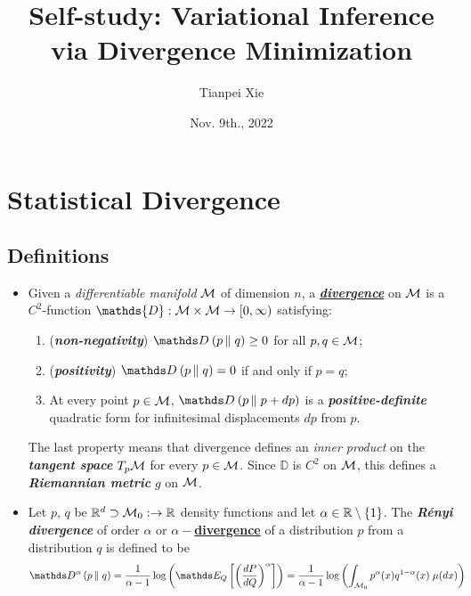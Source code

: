 \documentclass[11pt]{article}
\begin{document}
\title{Self-study: Variational Inference via  Divergence Minimization}
\author{Tianpei Xie}
\date{ Nov. 9th., 2022 }
\maketitle
\tableofcontents
\newpage
\section{Statistical Divergence}
\subsection{Definitions}
\begin{itemize}
\item \begin{definition}
Given a \emph{differentiable manifold} ${\mathcal M}$ of dimension $n$, a \underline{\emph{\textbf{divergence}}} on ${\mathcal M}$ is a $C^{2}$-function $\mathds{D}: \cM\times \cM \to [0,\infty )$  satisfying:
\begin{enumerate}
\item (\textbf{\emph{non-negativity}}) $\divg{}{p}{q} \geq 0$ for all $p,q\in {\mathcal M}$;
\item (\textbf{\emph{positivity}}) $\divg{}{p}{q} =0$ if and only if $p=q$;
\item At every point $p\in {\mathcal M}$,  $\divg{}{p}{p+dp}$  is a \emph{\textbf{positive-definite}} quadratic form for infinitesimal displacements $dp$ from $p$. 
\end{enumerate} The last property means that divergence defines an \emph{inner product} on the \emph{\textbf{tangent space}} $T_{p}{\mathcal M}$ for every $p\in {\mathcal M}$. Since $\mathds{D}$ is $C^{2}$ on ${\mathcal M}$, this defines a \emph{\textbf{Riemannian metric}} $g$ on ${\mathcal M}$.
\end{definition}




\item \begin{definition}
Let $p$, $q$ be ${\mathbb R}^d \supset {\mathcal M}_{0}: \rightarrow  {\mathbb R}$ density functions and let $\alpha \in {\mathbb R} \setminus \left\{1\right\}$. The \emph{\textbf{R\'enyi divergence}} of order $\alpha$ or \underline{\textbf{$\alpha-$divergence}} of a distribution $p$ from a distribution $q$ is defined to be 
\begin{align}
\divg{\alpha}{p}{q} &= \frac{1}{\alpha -1}\log\paren{\E{Q}{\paren{\frac{dP}{dQ}}^{\alpha}}}  = \frac{1}{\alpha -1}\log\paren{\int_{ \cM_{0}}p^{\alpha}(x)q^{1-\alpha}(x)\;  \mu(dx)} \label{eqn: alpha_divg}
\end{align} 
\end{definition}


\end{itemize}
\end{document}
